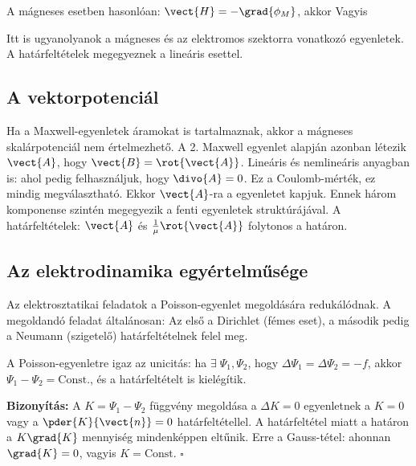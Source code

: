     A mágneses esetben hasonlóan: $\vect{H}=-\grad{\phi_M}$, akkor
    Vagyis 
    
    Itt is ugyanolyanok a mágneses és az elektromos szektorra vonatkozó egyenletek.
   A határfeltételek megegyeznek a lineáris esettel.
    
  \subsection{A vektorpotenciál}
   
   Ha a Maxwell-egyenletek áramokat is tartalmaznak, akkor a mágneses skalárpotenciál nem értelmezhető.
   A 2. Maxwell egyenlet alapján azonban létezik $\vect{A}$, hogy $\vect{B}=\rot{\vect{A}}$.
   Lineáris és nemlineáris anyagban is:
   ahol pedig felhasználjuk, hogy $\divo{A}=0$.
   Ez a Coulomb-mérték, ez mindig megválasztható.
   Ekkor $\vect{A}$-ra a
   egyenletet kapjuk.
   Ennek három komponense szintén megegyezik a fenti egyenletek struktúrájával.
   A határfeltételek: $\vect{A}$ és $\frac{1}{\mu}\rot{\vect{A}}$ folytonos a határon. 

  \subsection{Az elektrodinamika egyértelműsége}
   
   Az elektrosztatikai feladatok a Poisson-egyenlet megoldására redukálódnak.
   A megoldandó feladat általánosan:
   Az első a Dirichlet (fémes eset), a második pedig a Neumann (szigetelő) határfeltételnek felel meg. 
   
   A Poisson-egyenletre igaz az unicitás: ha $\exists\;\Psi_1,\Psi_2$, hogy $\Delta\Psi_1=\Delta\Psi_2=-f$, akkor $\Psi_1-\Psi_2=\text{Const.}$, és a határfeltételt is kielégítik.
   
   {\bf Bizonyítás:} A $K=\Psi_1-\Psi_2$ függvény megoldása a $\Delta K=0$ egyenletnek a $K=0$ vagy a $\pder{K}{\vect{n}}=0$ határfeltétellel.
   A határfeltétel miatt a határon a $K\grad{K}$ mennyiség mindenképpen eltűnik.
   Erre a Gauss-tétel:
   ahonnan $\grad{K}=0$, vagyis $K=\text{Const}$. $\square$

